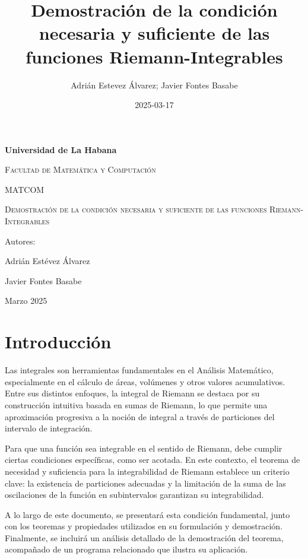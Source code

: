\documentclass[10pt]{article}
\title{Demostración de la condición necesaria y suficiente de las funciones Riemann-Integrables}
\date{2025-03-17}
\author{Adrián Estevez Álvarez; Javier Fontes Basabe  }
\begin{document}
\begin{titlepage}
		\centering
			{\bfseries\LARGE Universidad de La Habana \par}
				\vspace{1cm}
			{\scshape\Large Facultad de Matemática y Computación \par}
			{\scshape\Large MATCOM \par}
				\vspace{3cm}
			{\scshape\Huge Demostración de la condición necesaria y suficiente de las funciones Riemann-Integrables \par}
				\vspace{3cm}
			
				\vfill
			{\Large Autores: \par}
			{\Large Adrián Estévez Álvarez \par}
			{\Large Javier Fontes Basabe \par}
				\vfill
			{\Large Marzo 2025 \par}
	\end{titlepage}


\section{Introducción}
Las integrales son herramientas fundamentales en el Análisis Matemático, especialmente en el cálculo de áreas, volúmenes y otros valores acumulativos. Entre sus distintos enfoques, la integral de Riemann se destaca por su construcción intuitiva basada en sumas de Riemann, lo que permite una aproximación progresiva a la noción de integral a través de particiones del intervalo de integración. \par

Para que una función sea integrable en el sentido de Riemann, debe cumplir ciertas condiciones específicas, como ser acotada. En este contexto, el teorema de necesidad y suficiencia para la integrabilidad de Riemann establece un criterio clave: la existencia de particiones adecuadas y la limitación de la suma de las oscilaciones de la función en subintervalos garantizan su integrabilidad.\par

A lo largo de este documento, se presentará esta condición fundamental, junto con los teoremas y propiedades utilizados en su formulación y demostración. Finalmente, se incluirá un análisis detallado de la demostración del teorema, acompañado de un programa relacionado que ilustra su aplicación.\par
\end{document}
